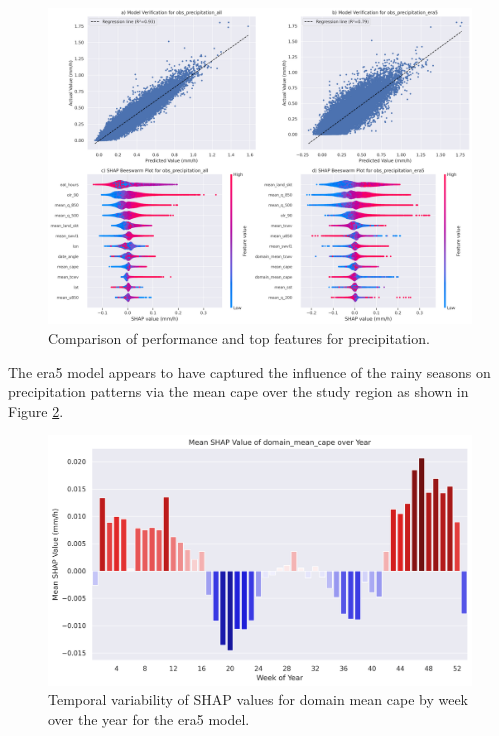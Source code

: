 \begin{figure}[ht]
    \centering
    \includegraphics[width=\textwidth]{../figures/generated/experiments/obs_precipitation/obs_precipitation_summary.png}
    \caption{Comparison of performance and top features for precipitation.}
    \label{fig:obs_precipitation_summary}
\end{figure}

The \acrshort{era5} model appears to have captured the influence of the rainy seasons  on precipitation patterns via the mean \acrshort{cape} over the study region as shown in Figure \ref{fig:obs_precipitation_era5_shap_domain_mean_cape_by_week_over_year}.

\begin{figure}[ht]
    \centering
    \includegraphics[width=\textwidth]{../figures/generated/experiments/obs_precipitation/temporal_corr/obs_precipitation_era5_shap_domain_mean_cape_by_week_over_year.png}
    \caption{Temporal variability of SHAP values for domain mean \acrshort{cape} by week over the year for the \acrshort{era5} model.}
    \label{fig:obs_precipitation_era5_shap_domain_mean_cape_by_week_over_year}
\end{figure}